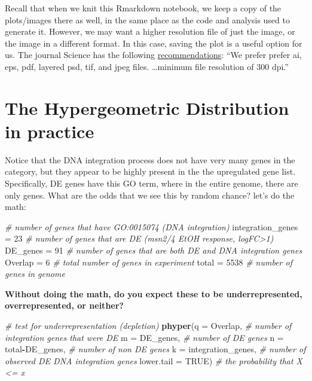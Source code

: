 \documentclass[
]{book}
\newenvironment{Shaded}{\begin{snugshade}}{\end{snugshade}}
\newcommand{\AttributeTok}[1]{\textcolor[rgb]{0.13,0.29,0.53}{#1}}
\newcommand{\CommentTok}[1]{\textcolor[rgb]{0.56,0.35,0.01}{\textit{#1}}}
\newcommand{\ConstantTok}[1]{\textcolor[rgb]{0.56,0.35,0.01}{#1}}
\newcommand{\DecValTok}[1]{\textcolor[rgb]{0.00,0.00,0.81}{#1}}
\newcommand{\FunctionTok}[1]{\textcolor[rgb]{0.13,0.29,0.53}{\textbf{#1}}}
\newcommand{\NormalTok}[1]{#1}
\newcommand{\OtherTok}[1]{\textcolor[rgb]{0.56,0.35,0.01}{#1}}
\newcommand{\SpecialCharTok}[1]{\textcolor[rgb]{0.81,0.36,0.00}{\textbf{#1}}}
\begin{document}
Recall that when we knit this Rmarkdown notebook, we keep a copy of the plots/images there as well, in the same place as the code and analysis used to generate it. However, we may want a higher resolution file of just the image, or the image in a different format. In this case, saving the plot is a useful option for us. The journal Science has the following \href{https://www.science.org/do/10.5555/page.2385607/full/author_figure_prep_guide_2022-1689707679870.pdf}{recommendations}: ``We prefer prefer ai, eps, pdf, layered psd, tif, and jpeg files. \ldots minimum file resolution of 300 dpi.''

\hypertarget{the-hypergeometric-distribution-in-practice}{%
\section{The Hypergeometric Distribution in practice}\label{the-hypergeometric-distribution-in-practice}}

Notice that the DNA integration process does not have very many genes in the category, but they appear to be highly present in the the upregulated gene list. Specifically, DE genes have this GO term, where in the entire genome, there are only genes. What are the odds that we see this by random chance? let's do the math:

\begin{Shaded}
\begin{Highlighting}[]
\CommentTok{\# number of genes that have GO:0015074 (DNA integration)}
\NormalTok{integration\_genes }\OtherTok{=} \DecValTok{23}
\CommentTok{\# number of genes that are DE (msn2/4 EtOH response, logFC\textgreater{}1)}
\NormalTok{DE\_genes }\OtherTok{=} \DecValTok{91}
\CommentTok{\# number of genes that are both DE and DNA integration genes}
\NormalTok{Overlap }\OtherTok{=} \DecValTok{6}
\CommentTok{\# total number of genes in experiment}
\NormalTok{total }\OtherTok{=} \DecValTok{5538} \CommentTok{\# number of genes in genome}
\end{Highlighting}
\end{Shaded}

\textbf{Without doing the math, do you expect these to be underrepresented, overrepresented, or neither?}

\begin{Shaded}
\begin{Highlighting}[]
\CommentTok{\# test for underrepresentation (depletion)}
\FunctionTok{phyper}\NormalTok{(}\AttributeTok{q =}\NormalTok{ Overlap, }\CommentTok{\# number of integration genes that were DE}
       \AttributeTok{m =}\NormalTok{ DE\_genes, }\CommentTok{\# number of DE genes}
       \AttributeTok{n =}\NormalTok{ total}\SpecialCharTok{{-}}\NormalTok{DE\_genes, }\CommentTok{\# number of non DE genes}
       \AttributeTok{k =}\NormalTok{ integration\_genes, }\CommentTok{\# number of observed DE DNA integration genes}
       \AttributeTok{lower.tail =} \ConstantTok{TRUE}\NormalTok{) }\CommentTok{\# the probability that X \textless{}= x}
\end{Highlighting}
\end{Shaded}
\end{document}
